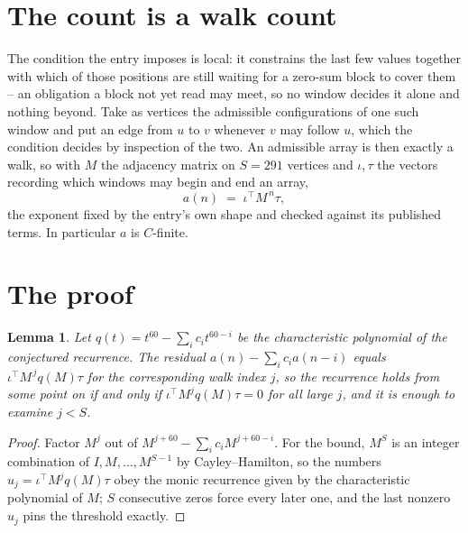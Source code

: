 \documentclass[11pt,a4paper]{article}
\theoremstyle{plain}
\newtheorem{lemma}[theorem]{Lemma}
\theoremstyle{definition}
\begin{document}
\section{The count is a walk count}

The condition the entry imposes is local: it constrains the last few values together with which of those positions are still waiting for a zero-sum block to cover them -- an obligation a block not yet read may meet, so no window decides it alone and nothing beyond. Take as
vertices the admissible configurations of one such window and put an edge from $u$ to $v$
whenever $v$ may follow $u$, which the condition decides by inspection of the two. An
admissible array is then exactly a walk, so with $M$ the adjacency matrix on $S=291$ vertices
and $\iota,\tau$ the vectors recording which windows may begin and end an array,
\[
a(n)\;=\;\iota^{\!\top}M^{\,n}\tau ,
\]
the exponent fixed by the entry's own shape and checked against its published terms. In
particular $a$ is $C$-finite.

\section{The proof}

\begin{lemma}\label{lem:crit}
Let $q(t)=t^{60}-\sum_i c_it^{60-i}$ be the characteristic polynomial of the
conjectured recurrence. The residual $a(n)-\sum_ic_ia(n-i)$ equals
$\iota^{\!\top}M^{\,j}q(M)\tau$ for the corresponding walk index $j$, so the recurrence
holds from some point on if and only if $\iota^{\!\top}M^{j}q(M)\tau=0$ for all large $j$,
and it is enough to examine $j<S$.
\end{lemma}

\begin{proof}
Factor $M^{j}$ out of $M^{j+60}-\sum_ic_iM^{j+60-i}$. For the bound, $M^{S}$
is an integer combination of $I,M,\dots,M^{S-1}$ by Cayley--Hamilton, so the numbers
$u_j=\iota^{\!\top}M^{j}q(M)\tau$ obey the monic recurrence given by the characteristic
polynomial of $M$; $S$ consecutive zeros force every later one, and the last nonzero $u_j$
pins the threshold exactly.
\end{proof}
\end{document}
